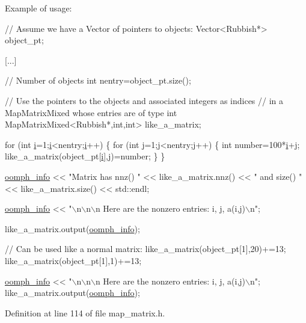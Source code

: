 Example of usage\+: 
\begin{DoxyCode}
 \textcolor{comment}{// Assume we have a Vector of pointers to objects:}
 Vector<Rubbish*> object\_pt;
 
 [...]

 \textcolor{comment}{// Number of objects}
 \textcolor{keywordtype}{int} nentry=object\_pt.size();

 \textcolor{comment}{// Use the pointers to the objects and associated integers as indices }
 \textcolor{comment}{// in a MapMatrixMixed whose entries are of type int}
 MapMatrixMixed<Rubbish*,int,int> like\_a\_matrix;

 \textcolor{keywordflow}{for} (\textcolor{keywordtype}{int} \hyperlink{cfortran_8h_adb50e893b86b3e55e751a42eab3cba82}{i}=1;\hyperlink{cfortran_8h_adb50e893b86b3e55e751a42eab3cba82}{i}<nentry;\hyperlink{cfortran_8h_adb50e893b86b3e55e751a42eab3cba82}{i}++)
  \{
   \textcolor{keywordflow}{for} (\textcolor{keywordtype}{int} j=1;j<nentry;j++)
    \{
     \textcolor{keywordtype}{int} number=100*\hyperlink{cfortran_8h_adb50e893b86b3e55e751a42eab3cba82}{i}+j;
     like\_a\_matrix(object\_pt[\hyperlink{cfortran_8h_adb50e893b86b3e55e751a42eab3cba82}{i}],j)=number;
    \}
  \}

 \hyperlink{namespaceoomph_aec474227917784dc0a255faf289cfc16}{oomph\_info} << \textcolor{stringliteral}{"Matrix has nnz() "} << like\_a\_matrix.nnz() << 
         \textcolor{stringliteral}{" and size() "} << like\_a\_matrix.size() << std::endl; 

 \hyperlink{namespaceoomph_aec474227917784dc0a255faf289cfc16}{oomph\_info} << \textcolor{stringliteral}{"\(\backslash\)n\(\backslash\)n\(\backslash\)n Here are the nonzero entries: i, j, a(i,j)\(\backslash\)n"};

 like\_a\_matrix.output(\hyperlink{namespaceoomph_aec474227917784dc0a255faf289cfc16}{oomph\_info});

 \textcolor{comment}{// Can be used like a normal matrix:}
 like\_a\_matrix(object\_pt[1],20)+=13;
 like\_a\_matrix(object\_pt[1],1)+=13;

 \hyperlink{namespaceoomph_aec474227917784dc0a255faf289cfc16}{oomph\_info} << \textcolor{stringliteral}{"\(\backslash\)n\(\backslash\)n\(\backslash\)n Here are the nonzero entries: i, j, a(i,j)\(\backslash\)n"};
like\_a\_matrix.output(\hyperlink{namespaceoomph_aec474227917784dc0a255faf289cfc16}{oomph\_info});
\end{DoxyCode}
 

Definition at line 114 of file map\+\_\+matrix.\+h.



